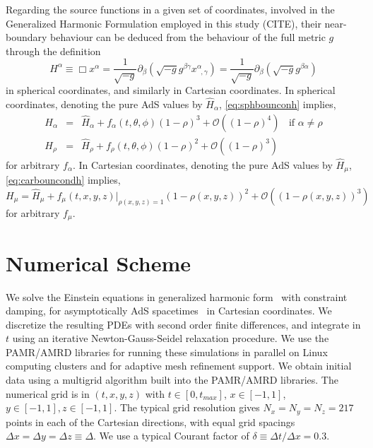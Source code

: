 \documentclass[a4paper,11pt]{article}
\begin{document}
Regarding the source functions in a given set of coordinates, involved in the Generalized Harmonic Formulation employed in this study (CITE), their near-boundary behaviour can be deduced from the behaviour of the full metric $g$ through the definition 
\begin{equation}\label{eq:defsoufunsph}
H^\alpha \equiv \Box x^\alpha = \frac{1}{\sqrt{-g}}\partial_\beta (\sqrt{-g}g^{\beta\gamma}x^\alpha_{\;\;,\gamma})=\frac{1}{\sqrt{-g}}\partial_\beta (\sqrt{-g}g^{\beta\alpha})
\end{equation}
in spherical coordinates, and similarly in Cartesian coordinates. 
In spherical coordinates, denoting the pure AdS values by $\hat{H}_\alpha$, \eqref{eq:sphbounconh} implies,
\begin{eqnarray}\label{eq:sphbouncondsoufunc}
H_\alpha&=&\hat{H}_\alpha+f_\alpha(t,\theta,\phi)(1-\rho)^3+\mathcal{O}((1-\rho)^4) \;\; \textrm{ if $\alpha\neq\rho$} \\ \nonumber
H_\rho&=&\hat{H}_\rho+f_\rho(t,\theta,\phi)(1-\rho)^2+\mathcal{O}((1-\rho)^3)
\end{eqnarray}
for arbitrary $f_\alpha$.
In Cartesian coordinates,  denoting the pure AdS values by $\hat{H}_\mu$, \eqref{eq:carbouncondh} implies,
\begin{equation}\label{eq:carbouncondsoufun}
H_\mu=\hat{H}_\mu+f_\mu(t,x,y,z)|_{\rho(x,y,z)=1}(1-\rho(x,y,z))^2+\mathcal{O}((1-\rho(x,y,z))^3)
\end{equation}
for arbitrary $f_\mu$.
\fi

\iffalse
\section{Numerical Scheme}\label{sec:numerical_scheme}

We solve the Einstein equations in generalized harmonic form~\cite{Pretorius:2004jg} with constraint damping, for asymptotically AdS spacetimes~\cite{Bantilan:2012vu} in Cartesian coordinates.
We discretize the resulting PDEs with second order finite differences, and integrate in $t$ using an iterative Newton-Gauss-Seidel relaxation procedure. 
We use the PAMR/AMRD libraries \cite{PAMR} for running these simulations in parallel on Linux computing clusters and for adaptive mesh refinement support.
We obtain initial data using a multigrid algorithm built into the PAMR/AMRD libraries.
The numerical grid is in $(t,x,y,z)$ with $t \in [0,t_{max}]$, $x \in [-1,1]$, $y \in [-1,1], z \in [-1,1]$.
The typical grid resolution gives $N_x=N_y=N_z=217$ points in each of the Cartesian directions, with equal grid spacings $\Delta x = \Delta y = \Delta z\equiv \Delta$.
We use a typical Courant factor of $\delta \equiv \Delta t / \Delta x = 0.3$.
\end{document}
